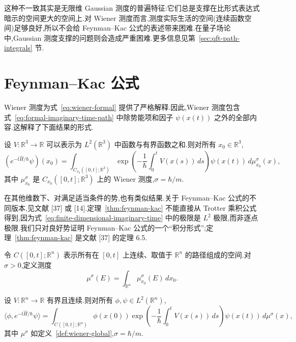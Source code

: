 这种不一致其实是无限维 Gaussian 测度的普遍特征:它们总是支撑在比形式表达式暗示的空间更大的空间上.对 Wiener 测度而言,测度实际生活的空间(连续函数空间)足够良好,所以不会给 Feynman--Kac 公式的表述带来困难.在量子场论中,Gaussian 测度支撑的问题则会造成严重困难.更多信息见第~\ref{sec:qft-path-integrals} 节.

\section{Feynman--Kac 公式}
\label{sec:feynman-kac}

Wiener 测度为式~\eqref{eq:wiener-formal} 提供了严格解释.因此,Wiener 测度包含式~\eqref{eq:formal-imaginary-time-path} 中除势能项和因子 $\psi(x(t))$ 之外的全部内容.这解释了下面结果的形式.

\begin{theorem}\label{thm:feynman-kac}
设 $V:\mathbb R^3\to\mathbb R$ 可以表示为 $L^2(\mathbb R^3)$ 中函数与有界函数之和.则对所有 $x_0\in\mathbb R^3$,
\[
 (e^{-t\widehat H/\hbar}\psi)(x_0)
 =\int_{C_{x_0}([0,t];\mathbb R^3)}
 \exp\left(-\frac1\hbar\int_0^tV(x(s))\,ds\right)
 \psi(x(t))\,d\mu_{x_0}^{\sigma}(x),\label{eq:feynman-kac-formula}
\]
其中 $\mu_{x_0}^{\sigma}$ 是 $C_{x_0}([0,t];\mathbb R^3)$ 上的 Wiener 测度,$\sigma=\hbar/m$.
\end{theorem}

在其他维数下、对满足适当条件的势,也有类似结果.关于 Feynman--Kac 公式的不同版本,见文献 [37] 或 [14].定理~\ref{thm:feynman-kac} 不能直接从 Trotter 乘积公式得到,因为式~\eqref{eq:finite-dimensional-imaginary-time} 中的极限是 $L^2$ 极限,而非逐点极限.我们只对良好势证明 Feynman--Kac 公式的一个“积分形式”;定理~\ref{thm:feynman-kac} 是文献 [37] 的定理 6.5.

\begin{definition}\label{def:wiener-global}
令 $C([0,t];\mathbb R^n)$ 表示所有在 $[0,t]$ 上连续、取值于 $\mathbb R^n$ 的路径组成的空间.对 $\sigma>0$,定义测度
\[
 \mu^\sigma(E)=\int_{\mathbb R^n}\mu_{x_0}^{\sigma}(E)\,dx_0.
\]
\end{definition}

\begin{proposition}\label{prop:integrated-feynman-kac}
设 $V:\mathbb R^n\to\mathbb R$ 有界且连续.则对所有 $\phi,\psi\in L^2(\mathbb R^n)$,
\[
 \langle\phi,e^{-t\widehat H/\hbar}\psi\rangle
 =\int_{C([0,t];\mathbb R^n)}
 \phi(x(0))\exp\left(-\frac1\hbar\int_0^tV(x(s))\,ds\right)
 \psi(x(t))\,d\mu^\sigma(x),\label{eq:integrated-feynman-kac}
\]
其中 $\mu^\sigma$ 如定义~\ref{def:wiener-global},$\sigma=\hbar/m$.
\end{proposition}


